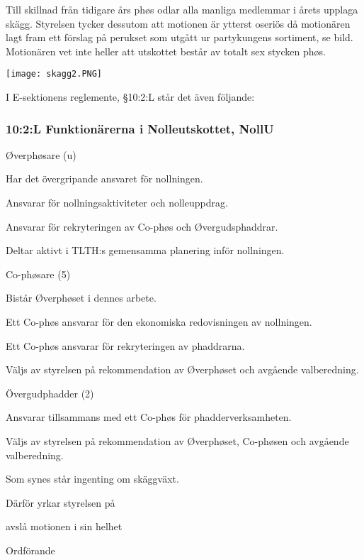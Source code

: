 \documentclass[../_main/handlingar.tex]{subfiles}
\begin{document}
\motionssvar
Till skillnad från tidigare års phøs odlar alla manliga medlemmar i årets upplaga skägg. Styrelsen tycker dessutom att motionen är ytterst oseriös då motionären lagt fram ett förslag på perukset som utgått ur partykungens sortiment, se bild. Motionären vet inte heller att utskottet består av totalt sex stycken phøs.

\begin{center}
	\texttt{[image: skagg2.PNG]}
\end{center}

\newpage
I E-sektionens reglemente, \S10:2:L står det även följande:

\subsubsection{10:2:L Funktionärerna i Nolleutskottet, NollU}

\begin{emptylist}
    \item Øverphøsare (u)
        \begin{dashlist}
            \item Har det övergripande ansvaret för nollningen.
            \item Ansvarar för nollningsaktiviteter och nolleuppdrag.
            \item Ansvarar för rekryteringen av Co-phøs och Øvergudsphaddrar.
            \item Deltar aktivt i TLTH:s gemensamma planering inför nollningen.
        \end{dashlist}
    \item Co-phøsare (5)
        \begin{dashlist}
          \item Bistår Øverphøset i dennes arbete.
          \item Ett Co-phøs ansvarar för den ekonomiska redovisningen av nollningen.
          \item Ett Co-phøs ansvarar för rekryteringen av phaddrarna.
          \item Väljs av styrelsen på rekommendation av Øverphøset och avgående valberedning.
        \end{dashlist}
    \item Övergudphadder (2)
        \begin{dashlist}
          \item Ansvarar tillsammans med ett Co-phøs för phadderverksamheten.
          \item Väljs av styrelsen på rekommendation av Øverphøset, Co-phøsen och avgående
          valberedning.
        \end{dashlist}
\end{emptylist}
Som synes står ingenting om skäggväxt.

Därför yrkar styrelsen på 
\begin{attsatser}
    \att avslå motionen i sin helhet
\end{attsatser}

\begin{signatures}{1}
    \ist
    \signature{Daniel Bakic}{Ordförande}
\end{signatures}
\end{document}
